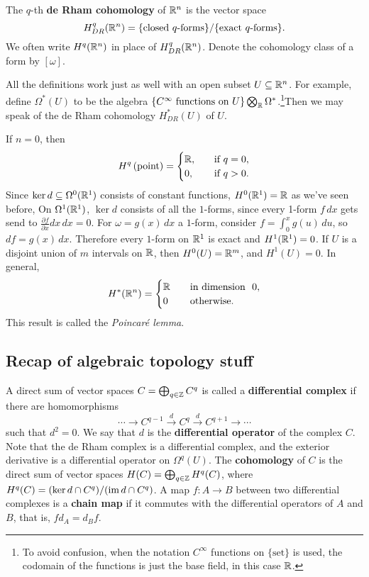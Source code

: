 \begin{definition}[]
    The $q$-th \textbf{de Rham cohomology} of $\mathbb{R}^n $ is the vector space \[
        H_{DR}^q (\R^n )= \{\text{closed} \ q\text{-forms}\} / \{\text{exact} \ q\text{-forms}  \} .
    \] We often write $H^q(\mathbb{R}^n )$ in place of $H_{DR}^q(\mathbb{R}^n )$. Denote the cohomology class of a form by $[\omega]$.
\end{definition}
All the definitions work just as well with an open subset $U\subseteq \mathbb{R}^n $. For example, define $\Omega^*(U)$ to be the algebra $\{C^{\infty} \ \text{functions on} \ U\} \bigotimes _{\R}\Omega^*$.\footnote{To avoid confusion, when the notation $C^{\infty}$ functions on $\{\text{set} \} $ is used, the codomain of the functions is just the base field, in this case $\mathbb{R}$.}Then we may speak of the de Rham cohomology $H_{DR}^*(U)$ of $U$.
\begin{example}
    If $n=0$, then \[
        H^q \left( \text{point}   \right) =
    \begin{cases}
        \mathbb{R},\quad &\text{if} \ q=0,\\
        0,& \text{if} \ q>0.
    \end{cases}
\] Since $\ker d \subseteq \Omega^0(\mathbb{R}^1)$ consists of constant functions, $H^0(\mathbb{R}^1)=\mathbb{R}$ as we've seen before, On $\Omega^1(\mathbb{R}^1)$, $\ker d$ consists of all the $1$-forms, since every 1-form $f\,dx$ gets send to $\frac{\partial f}{\partial x}dx\,dx=0$. For $\omega=g(x)\,dx$ a $1$-form, consider $f= \int_{0}^{x} g(u) \, du$, so $df=g(x)\,dx$. Therefore every $1$-form on $\mathbb{R}^1$ is exact and $H^1(\mathbb{R}^1)=0$. If $U$ is a disjoint union of $m$ intervals on $\mathbb{R}$, then $H^0(U)=\mathbb{R}^m$, and $H^1(U)=0$. In general, 
\[
    H^*(\mathbb{R}^n )=
    \begin{cases}
        \mathbb{R}\quad& \text{in dimension } \ 0,\\
        0 & \text{otherwise.} 
    \end{cases}
\] This result is called the \emph{Poincar\'e lemma}.
\end{example}

\subsection{Recap of algebraic topology stuff}
A direct sum of vector spaces $C=\bigoplus_{q\in \mathbb{Z}}C^q$ is called a \textbf{differential complex} if there are homomorphisms \[
    \cdots \to C^{q-1}\overset{d}{\to } C^q \overset{d}{\to } C^{q+1}\to \cdots 
\] such that $d^2=0$. We say that $d$ is the \textbf{differential operator} of the complex $C$. Note that the de Rham complex is a differential complex, and the exterior derivative is a differential operator on  $\Omega^q(U)$. The \textbf{cohomology} of $C$ is the direct sum of vector spaces $H(C)=\bigoplus_{q\in \mathbb{Z}}H^q(C)$, where $H^q(C)=(\ker d \cap C^q) / (\operatorname{im} d \cap C^q)$. A map $f \colon A \to B$ between two differential complexes is a \textbf{chain map} if it commutes with the differential operators of $A$ and $B$, that is, $f d_A=d_Bf$. 

